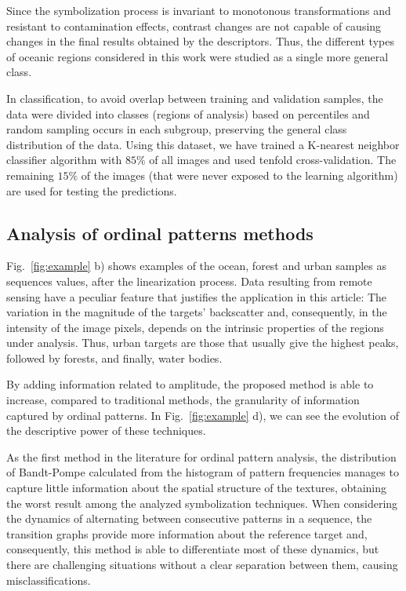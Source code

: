 \documentclass[journal]{IEEEtran}
\begin{document}
	Since the symbolization process is invariant to monotonous transformations and resistant to contamination effects, contrast changes are not capable of causing changes in the final results obtained by the descriptors.
	Thus, the different types of oceanic regions considered in this work were studied as a single more general class.
	
	In classification, to avoid overlap between training and validation samples, the data were divided into classes (regions of analysis) based on percentiles and random sampling occurs in each subgroup, preserving the general class distribution of the data.
	Using this dataset, we have trained a K-nearest neighbor classifier algorithm with $85\%$ of all images and used tenfold cross-validation. 
	The remaining $15\%$ of the images (that were never exposed to the learning algorithm) are used for testing the predictions.
	
	\subsection{Analysis of ordinal patterns methods}
	
	Fig.~\ref{fig:example} b) shows examples of the ocean, forest and urban samples as sequences values, after the linearization process.
	Data resulting from remote sensing have a peculiar feature that justifies the application in this article:
	The variation in the magnitude of the targets' backscatter and, consequently, in the intensity of the image pixels, depends on the intrinsic properties of the regions under analysis.
	Thus, urban targets are those that usually give the highest peaks, followed by forests, and finally, water bodies.
	
	By adding information related to amplitude, the proposed method is able to increase, compared to traditional methods, the granularity of information captured by ordinal patterns.
	In Fig.~\ref{fig:example} d), we can see the evolution of the descriptive power of these techniques.
	
	As the first method in the literature for ordinal pattern analysis, the distribution of Bandt-Pompe calculated from the histogram of pattern frequencies manages to capture little information about the spatial structure of the textures, obtaining the worst result among the analyzed symbolization techniques. 
	When considering the dynamics of alternating between consecutive patterns in a sequence, the transition graphs provide more information about the reference target and, consequently, this method is able to differentiate most of these dynamics, but there are challenging situations without a clear separation between them, causing misclassifications.
	
\end{document}
